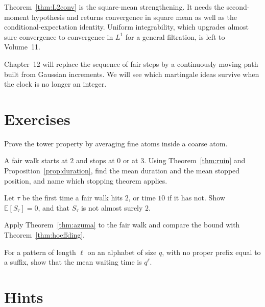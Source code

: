 Theorem~\ref{thm:L2conv} is the square-mean strengthening. It needs the second-moment hypothesis and returns convergence in square mean as well as the conditional-expectation identity. Uniform integrability, which upgrades almost sure convergence to convergence in $L^1$ for a general filtration, is left to Volume~11.

Chapter~12 will replace the sequence of fair steps by a continuously moving path built from Gaussian increments. We will see which martingale ideas survive when the clock is no longer an integer.

\section{Exercises}

\begin{exercise}[$\star$]\label{ex:tower}
Prove the tower property by averaging fine atoms inside a coarse atom.
\end{exercise}

\begin{exercise}[$\star\star$]\label{ex:barrier}
A fair walk starts at $2$ and stops at $0$ or at $3$. Using Theorem~\ref{thm:ruin} and Proposition~\ref{prop:duration}, find the mean duration and the mean stopped position, and name which stopping theorem applies.
\end{exercise}

\begin{exercise}[$\star\star$]\label{ex:stopmean}
Let $\tau$ be the first time a fair walk hits $2$, or time $10$ if it has not. Show $\mathbb E[S_\tau]=0$, and that $S_\tau$ is not almost surely $2$.
\end{exercise}

\begin{exercise}[$\star\star$]\label{ex:azumacoin}
Apply Theorem~\ref{thm:azuma} to the fair walk and compare the bound with Theorem~\ref{thm:hoeffding}.
\end{exercise}

\begin{exercise}[$\star\star$]\label{ex:pattern}
For a pattern of length $\ell$ on an alphabet of size $q$, with no proper prefix equal to a suffix, show that the mean waiting time is $q^\ell$.
\end{exercise}

\section{Hints}

